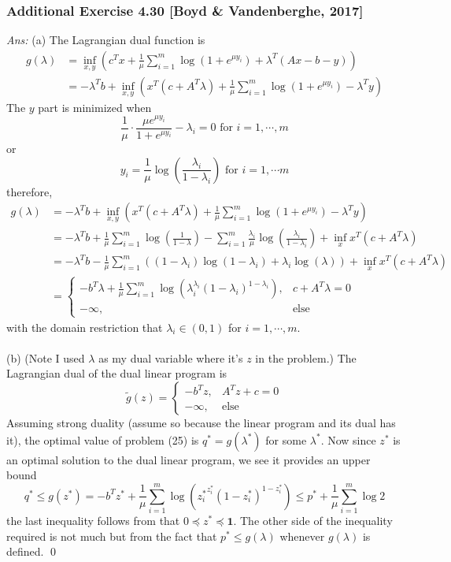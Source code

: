 \documentclass[12pt,a4paper]{article}
\renewcommand{\l}{\left}\renewcommand{\r}{\right}
\newcommand{\casebrak}[4]{\left \{ \begin{array}{ll} {#1},&{#2}\\{#3},&{#4} \end{array} \right.}
\newcommand{\SUM}[2]{\sum\limits_{#1}^{#2}}
\begin{document}
\newpage\subsubsection*{Additional Exercise 4.30 [Boyd \& Vandenberghe, 2017]}
{\it Ans:} (a) The Lagrangian dual function is
\begin{align*}
g(\lambda) &= \inf_{x, y}\l( c^T x + \frac1\mu \SUM{i=1}m \log(1+e^{\mu y_i}) + \lambda^T (Ax-b-y)\r) \\
&= - \lambda^T b + \inf_{x, y} \l(  x^T(c+A^T\lambda) + \frac1\mu \SUM{i=1}m \log(1+e^{\mu y_i}) -\lambda^T y\r) 
\end{align*}
The $y$ part is minimized when
$$\frac1\mu \cdot \frac{\mu e^{\mu y_i}}{1+e^{\mu y_i}} - \lambda_i = 0 \mbox{ for }i = 1, \cdots, m$$
or 
$$y_i = \frac1\mu \log\l(\frac{\lambda_i}{1-\lambda_i}\r) \mbox{ for } i = 1, \cdots m$$
therefore, 
\begin{align*}
g(\lambda) &= - \lambda^T b + \inf_{x, y} \l( x^T(c+A^T\lambda) + \frac1\mu \SUM{i=1}m \log(1+e^{\mu y_i}) -\lambda^T y  \r)\\
&= -\lambda^Tb + \frac1\mu \SUM{i=1}m \log\l(\frac1{1-\lambda}\r) - \SUM{i=1}m \frac{\lambda_i}{\mu} \log\l(\frac{\lambda_i}{1-\lambda_i}\r) + \inf_x x^T(c+A^T\lambda)\\
&= -\lambda^Tb-\frac{1}\mu\SUM{i=1}m \l((1-\lambda_i)\log(1-\lambda_i) + \lambda_i\log(\lambda)\r) + \inf_x x^T(c+A^T\lambda) \\
& =\casebrak{-b^T\lambda + \frac1\mu\SUM{i=1}m \log\l(\lambda_i^{\lambda_i}(1-\lambda_i)^{1-\lambda_i}\r)}{c+A^T\lambda = 0}{-\infty}{\mbox{else}}
\end{align*}
with the domain restriction that $\lambda_i \in (0,1)$ for $i=1, \cdots, m$. \\
\\
(b) (Note I used $\lambda$ as my dual variable where it's $z$ in the problem.) The Lagrangian dual of the dual linear program is 
$$\tilde g(z) = \casebrak{-b^Tz}{A^Tz+c = 0}{-\infty}{\mbox{else}}$$
Assuming strong duality (assume so because the linear program and its dual has it), the optimal value of problem (25) is $q^\ast = g(\lambda^\ast)$ for some $\lambda^\ast$. Now since $z^\ast$ is an optimal solution to the dual linear program, we see it provides an upper bound
$$q^\ast \leq g(z^\ast) = -b^Tz^\ast + \frac1\mu\SUM{i=1}m \log\l({z_i^\ast}^{z_i^\ast}(1-z_i^\ast)^{1-z^\ast_i}\r) \leq p^\ast + \frac1\mu\SUM{i=1}m\log2$$
the last inequality follows from that $0\preceq z^\ast \preceq \mathbf1$.
The other side of the inequality required is not much but from the fact that $p^\ast \leq g(\lambda)$ whenever $g(\lambda)$ is defined. \qed
\end{document}
